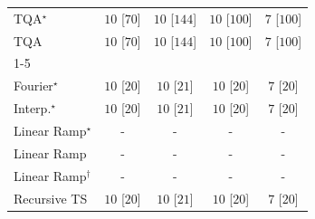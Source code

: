 \begin{tabular}{l|cccc|}
TQA$^\star$ & {\cellcolor[HTML]{00441B}} \color[HTML]{F1F1F1} $10$ [$70$] & {\cellcolor[HTML]{00441B}} \color[HTML]{F1F1F1} $10$ [$144$] & {\cellcolor[HTML]{00441B}} \color[HTML]{F1F1F1} $10$ [$100$] & {\cellcolor[HTML]{37A055}} \color[HTML]{F1F1F1} $7$ [$100$] \\
TQA & {\cellcolor[HTML]{00441B}} \color[HTML]{F1F1F1} $10$ [$70$] & {\cellcolor[HTML]{00441B}} \color[HTML]{F1F1F1} $10$ [$144$] & {\cellcolor[HTML]{00441B}} \color[HTML]{F1F1F1} $10$ [$100$] & {\cellcolor[HTML]{37A055}} \color[HTML]{F1F1F1} $7$ [$100$] \\
\cline{1-5}
\multicolumn{5}{c}{\rule{0pt}{8pt}SV} \\
\midrule
Fourier$^\star$ & {\cellcolor[HTML]{00441B}} \color[HTML]{F1F1F1} $10$ [$20$] & {\cellcolor[HTML]{00441B}} \color[HTML]{F1F1F1} $10$ [$21$] & {\cellcolor[HTML]{00441B}} \color[HTML]{F1F1F1} $10$ [$20$] & {\cellcolor[HTML]{37A055}} \color[HTML]{F1F1F1} $7$ [$20$] \\
Interp.$^\star$ & {\cellcolor[HTML]{00441B}} \color[HTML]{F1F1F1} $10$ [$20$] & {\cellcolor[HTML]{00441B}} \color[HTML]{F1F1F1} $10$ [$21$] & {\cellcolor[HTML]{00441B}} \color[HTML]{F1F1F1} $10$ [$20$] & {\cellcolor[HTML]{37A055}} \color[HTML]{F1F1F1} $7$ [$20$] \\
Linear Ramp$^\star$ & {\cellcolor[HTML]{000000}} \color[HTML]{F1F1F1} {\cellcolor{white}} \color{black} - & {\cellcolor[HTML]{000000}} \color[HTML]{F1F1F1} {\cellcolor{white}} \color{black} - & {\cellcolor[HTML]{000000}} \color[HTML]{F1F1F1} {\cellcolor{white}} \color{black} - & {\cellcolor[HTML]{000000}} \color[HTML]{F1F1F1} {\cellcolor{white}} \color{black} - \\
Linear Ramp & {\cellcolor[HTML]{000000}} \color[HTML]{F1F1F1} {\cellcolor{white}} \color{black} - & {\cellcolor[HTML]{000000}} \color[HTML]{F1F1F1} {\cellcolor{white}} \color{black} - & {\cellcolor[HTML]{000000}} \color[HTML]{F1F1F1} {\cellcolor{white}} \color{black} - & {\cellcolor[HTML]{000000}} \color[HTML]{F1F1F1} {\cellcolor{white}} \color{black} - \\
Linear Ramp$^\dagger$ & {\cellcolor[HTML]{000000}} \color[HTML]{F1F1F1} {\cellcolor{white}} \color{black} - & {\cellcolor[HTML]{000000}} \color[HTML]{F1F1F1} {\cellcolor{white}} \color{black} - & {\cellcolor[HTML]{000000}} \color[HTML]{F1F1F1} {\cellcolor{white}} \color{black} - & {\cellcolor[HTML]{000000}} \color[HTML]{F1F1F1} {\cellcolor{white}} \color{black} - \\
Recursive TS & {\cellcolor[HTML]{00441B}} \color[HTML]{F1F1F1} $10$ [$20$] & {\cellcolor[HTML]{00441B}} \color[HTML]{F1F1F1} $10$ [$21$] & {\cellcolor[HTML]{00441B}} \color[HTML]{F1F1F1} $10$ [$20$] & {\cellcolor[HTML]{37A055}} \color[HTML]{F1F1F1} $7$ [$20$] \\

\end{tabular}
